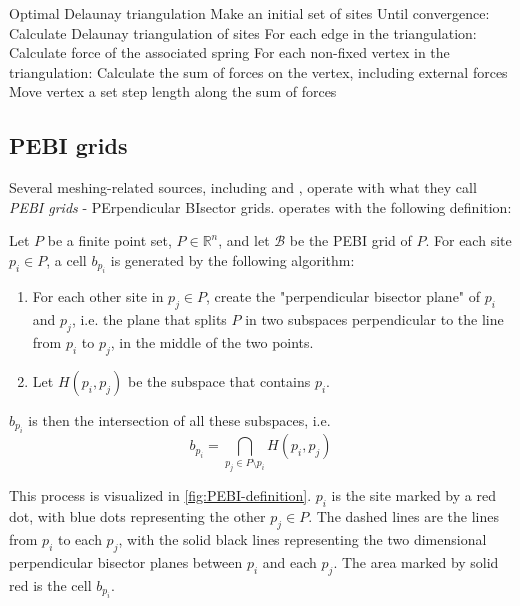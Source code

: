 \begin{pseudocode}[label=alg:delaunay_force]{Optimal Delaunay triangulation}
    Make an initial set of sites
    Until convergence:
        Calculate Delaunay triangulation of sites
        For each edge in the triangulation:
            Calculate force of the associated spring
        For each non-fixed vertex in the triangulation:
            Calculate the sum of forces on the vertex, including external forces
            Move vertex a set step length along the sum of forces
\end{pseudocode}

\subsection{PEBI grids}
Several meshing-related sources, including \cite{UPR_chapter} and \cite{UPR_thesis}, operate with what they call \emph{PEBI grids} - PErpendicular BIsector grids. \textcite{UPR_thesis} operates with the following definition:

\begin{definition}
\label{def:PEBI-grid}
Let $P$ be a finite point set, $P \in \mathbb{R}^n$, and let $\mathcal{B}$ be the PEBI grid of $P$. For each site $p_i \in P$, a cell $b_{p_i}$ is generated by the following algorithm:
\begin{enumerate}
    \item For each other site in $p_j \in P$, create the "perpendicular bisector plane" of $p_i$ and $p_j$, i.e. the plane that splits $P$ in two subspaces perpendicular to the line from $p_i$ to $p_j$, in the middle of the two points.
    \item Let $H(p_i, p_j)$ be the subspace that contains $p_i$.
\end{enumerate}
$b_{p_i}$ is then the intersection of all these subspaces, i.e.
\begin{equation}
    b_{p_i} = \bigcap_{p_j \in P \setminus p_i} H(p_i, p_j)
\end{equation}
\end{definition}

This process is visualized in \autoref{fig:PEBI-definition}. $p_i$ is the site marked by a red dot, with blue dots representing the other $p_j \in P$. The dashed lines are the lines from $p_i$ to each $p_j$, with the solid black lines representing the two dimensional perpendicular bisector planes between $p_i$ and each $p_j$. The area marked by solid red is the cell $b_{p_i}$.

